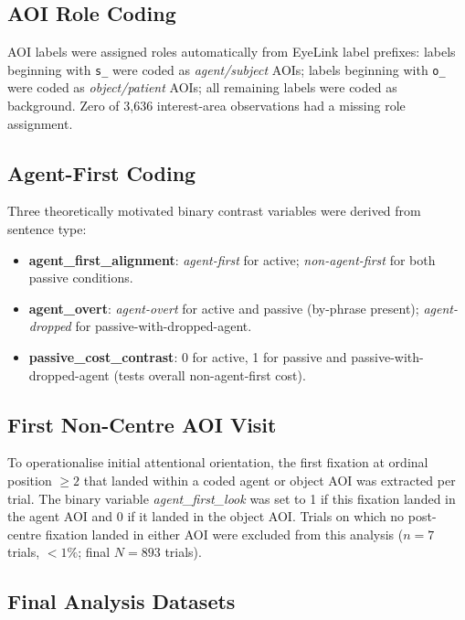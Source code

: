 \documentclass[12pt, a4paper]{article}
\begin{document}
\subsection{AOI Role Coding}

AOI labels were assigned roles automatically from EyeLink label prefixes:
labels beginning with \texttt{s\_} were coded as \emph{agent/subject} AOIs;
labels beginning with \texttt{o\_} were coded as \emph{object/patient} AOIs;
all remaining labels were coded as background.
Zero of 3,636 interest-area observations had a missing role assignment.

\subsection{Agent-First Coding}

Three theoretically motivated binary contrast variables were derived from
sentence type:
\begin{itemize}
  \item \textbf{agent\_first\_alignment}: \textit{agent-first} for active;
        \textit{non-agent-first} for both passive conditions.
  \item \textbf{agent\_overt}: \textit{agent-overt} for active and passive
        (by-phrase present); \textit{agent-dropped} for passive-with-dropped-agent.
  \item \textbf{passive\_cost\_contrast}: 0 for active, 1 for passive and
        passive-with-dropped-agent (tests overall non-agent-first cost).
\end{itemize}

\subsection{First Non-Centre AOI Visit}

To operationalise initial attentional orientation, the first fixation at
ordinal position $\geq 2$ that landed within a coded agent or object AOI was
extracted per trial.
The binary variable \textit{agent\_first\_look} was set to 1 if this
fixation landed in the agent AOI and 0 if it landed in the object AOI.
Trials on which no post-centre fixation landed in either AOI were excluded
from this analysis ($n = 7$ trials, $< 1\%$; final $N = 893$ trials).

\subsection{Final Analysis Datasets}
\end{document}
